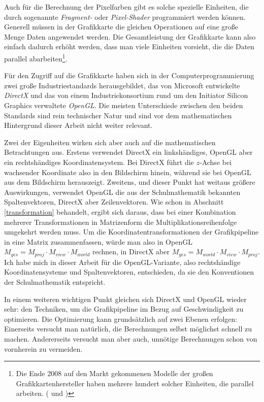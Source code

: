 Auch für die Berechnung der Pixelfarben gibt es solche spezielle Einheiten, die durch sogenannte \emph{Fragment-} oder \emph{Pixel-Shader} programmiert werden können. Generell müssen in der Grafikkarte die gleichen Operationen auf eine große Menge Daten angewendet werden. Die Gesamtleistung der Grafikkarte kann also einfach dadurch erhöht werden, dass man viele Einheiten vorsieht, die die Daten parallel abarbeiten\footnote{Die Ende 2008 auf den Markt gekommenen Modelle der großen Grafikkartenhersteller haben mehrere hundert solcher Einheiten, die parallel arbeiten. (\vgl \citep{atispecs} und \citep{nvidiaspecs})}.

\label{direct3dopengl}
Für den Zugriff auf die Grafikkarte haben sich in der Computerprogrammierung zwei große Industriestandards herausgebildet, das von Microsoft entwickelte \emph{DirectX} und das von einem Industriekonsortium rund um den Initiator Silicon Graphics verwaltete \emph{OpenGL}. Die meisten Unterschiede zwischen den beiden Standards sind rein technischer Natur und sind vor dem mathematischen Hintergrund dieser Arbeit nicht weiter relevant.

Zwei der Eigenheiten wirken sich aber auch auf die mathematischen Betrachtungen aus. Erstens verwendet DirectX ein linkshändiges, OpenGL aber ein rechtshändiges Koordinatensystem. Bei DirectX führt die $z$-Achse bei wachsender Koordinate also in den Bildschirm hinein, während sie bei OpenGL aus dem Bildschirm herauszeigt. Zweitens, und dieser Punkt hat weitaus größere Auswirkungen, verwendet OpenGL die aus der Schulmathematik bekannten Spaltenvektoren, DirectX aber Zeilenvektoren. Wie schon in Abschnitt \ref{transformation} behandelt, ergibt sich daraus, dass bei einer Kombination mehrerer Transformationen in Matrizenform die Multiplikationsreihenfolge umgekehrt werden muss. Um die Koordinatentransformationen der Grafikpipeline in eine Matrix zusammenfassen, würde man also in OpenGL $M_{ges} = M_{proj} \cdot M_{view} \cdot M_{world}$ rechnen, in DirectX aber $M_{ges} = M_{world} \cdot M_{view} \cdot M_{proj}$. Ich habe mich in dieser Arbeit für die OpenGL-Variante, also rechtshändige Koordinatensysteme und Spaltenvektoren, entschieden, da sie den Konventionen der Schulmathematik entspricht.

\label{performance}
In einem weiteren wichtigen Punkt gleichen sich DirectX und OpenGL wieder sehr: den Techniken, um die Grafikpipeline im Bezug auf Geschwindigkeit zu optimieren. Die Optimierung kann grundsätzlich auf zwei Ebenen erfolgen: Einerseits versucht man natürlich, die Berechnungen selbst möglichst schnell zu machen. Andererseits versucht man aber auch, unnötige Berechnungen schon von vornherein zu vermeiden.

